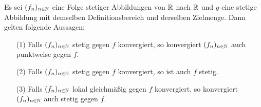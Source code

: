 \begin{prop}
  \label{prop:stetigkonv}
  Es sei $(f_n)_{n \in \mathbb{N}}$ eine Folge stetiger Abbildungen von $\mathbb{R}$ nach $\mathbb{R}$ und $g$ eine stetige Abbildung mit demselben Definitionsbereich und derselben Zielmenge.
  Dann gelten folgende Aussagen:
  \begin{itemize}
    \item[(1)] Falls $(f_n)_{n \in \mathbb{N}}$ stetig gegen $f$ konvergiert, so konvergiert $(f_n)_{n \in \mathbb{N}}$ auch punktweise gegen $f$.
    \item[(2)] Falls $(f_n)_{n \in \mathbb{N}}$ stetig gegen $f$ konvergiert, so ist auch $f$ stetig.
    \item[(3)] Falls $(f_n)_{n \in \mathbb{N}}$ lokal gleichmäßig gegen $f$ konvergiert, so konvergiert $(f_n)_{n \in \mathbb{N}}$ auch stetig gegen $f$.
  \end{itemize}
\end{prop}

